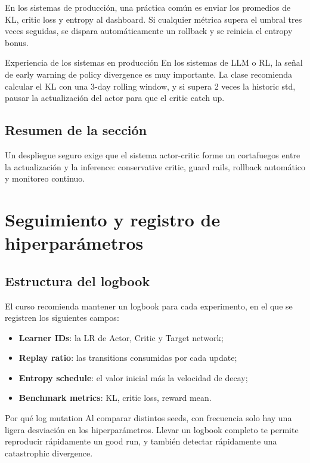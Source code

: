 \documentclass[a4paper]{article}
\begin{document}
En los sistemas de producción, una práctica común es enviar los promedios de KL, critic loss y entropy al dashboard. Si cualquier métrica supera el umbral tres veces seguidas, se dispara automáticamente un rollback y se reinicia el entropy bonus.

\begin{knowledgebox}{Experiencia de los sistemas en producción}
En los sistemas de LLM o RL, la señal de early warning de policy divergence es muy importante. La clase recomienda calcular el KL con una 3-day rolling window, y si supera 2 veces la historic std, pausar la actualización del actor para que el critic catch up.
\end{knowledgebox}

\subsection{Resumen de la sección}

Un despliegue seguro exige que el sistema actor-critic forme un cortafuegos entre la actualización y la inference: conservative critic, guard rails, rollback automático y monitoreo continuo.

\section{Seguimiento y registro de hiperparámetros}

\subsection{Estructura del logbook}

El curso recomienda mantener un logbook para cada experimento, en el que se registren los siguientes campos:

\begin{itemize}
    \item \textbf{Learner IDs}: la LR de Actor, Critic y Target network;
    \item \textbf{Replay ratio}: las transitions consumidas por cada update;
    \item \textbf{Entropy schedule}: el valor inicial más la velocidad de decay;
    \item \textbf{Benchmark metrics}: KL, critic loss, reward mean.
\end{itemize}

\begin{importantbox}{Por qué log mutation}
Al comparar distintos seeds, con frecuencia solo hay una ligera desviación en los hiperparámetros. Llevar un logbook completo te permite reproducir rápidamente un good run, y también detectar rápidamente una catastrophic divergence.
\end{importantbox}
\end{document}
